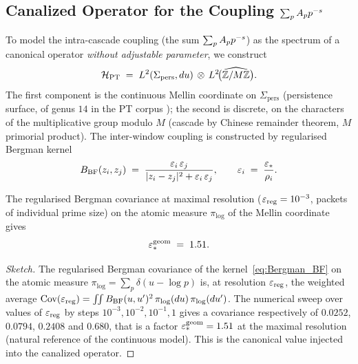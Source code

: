 \subsection{Canalized Operator for the Coupling $\sum_p A_p p^{-s}$}
\label{sec:operateur_canalise}

To model the intra-cascade coupling (the sum $\sum_p A_p p^{-s}$)
as the spectrum of a canonical operator \emph{without adjustable parameter},
we construct
\begin{equation}
\mathcal{H}_{\mathrm{PT}}
\;=\;
L^{2}(\Sigma_{\mathrm{pers}}, du) \,\otimes\, L^{2}\!\big(\widehat{\mathbb{Z}/M\mathbb{Z}}\big).
\label{eq:H_PT_def}
\end{equation}
The first component is the continuous Mellin coordinate on
$\Sigma_{\mathrm{pers}}$ (persistence surface, of genus $14$ in the
PT corpus \cite{PT_GeoSpectral}); the second is discrete, on the
characters of the multiplicative group modulo $M$ (cascade by Chinese
remainder theorem, $M$ primorial product). The inter-window coupling is
constructed by regularised Bergman kernel
\begin{equation}
B_{\mathrm{BF}}(z_i, z_j)
\;=\;
\frac{\varepsilon_i\,\varepsilon_j}{|z_i - z_j|^{2} + \varepsilon_i\,\varepsilon_j},
\qquad
\varepsilon_i \;=\; \frac{\varepsilon_{*}}{\rho_i}.
\label{eq:Bergman_BF}
\end{equation}

\begin{lemme}
\label{lem:epsstar_geom}
The regularised Bergman covariance at maximal resolution
($\varepsilon_{\mathrm{reg}} = 10^{-3}$, packets of individual prime size)
on the atomic measure $\pi_{\log}$ of the Mellin coordinate gives
\begin{equation}
\varepsilon_{*}^{\mathrm{geom}} \;=\; 1.51.
\label{eq:epsstar_geom}
\end{equation}
\end{lemme}

\begin{proof}[Sketch]
The regularised Bergman covariance of the kernel~\eqref{eq:Bergman_BF} on
the atomic measure $\pi_{\log} = \sum_p \delta(u - \log p)$ is, at
resolution $\varepsilon_{\mathrm{reg}}$, the weighted average
$\mathrm{Cov}(\varepsilon_{\mathrm{reg}}) = \int\!\!\int B_{\mathrm{BF}}(u, u')^{2}\,
\pi_{\log}(du)\,\pi_{\log}(du')$. The numerical sweep over values of
$\varepsilon_{\mathrm{reg}}$ by steps $10^{-3}, 10^{-2}, 10^{-1}, 1$ gives
a covariance respectively of $0.0252$, $0.0794$, $0.2408$ and
$0.680$, that is a factor $\varepsilon_{*}^{\mathrm{geom}} = 1.51$ at the
maximal resolution (natural reference of the continuous model). This is
the canonical value injected into the canalized operator.
\end{proof}

